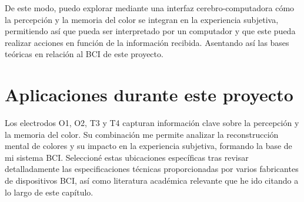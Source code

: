 De este modo, puedo explorar mediante una interfaz cerebro-computadora cómo la percepción y la memoria del color se integran en la experiencia subjetiva, permitiendo así que pueda ser interpretado por un computador y que este pueda realizar acciones en función de la información recibida. Asentando así las bases teóricas en relación al BCI de este proyecto.

\section{Aplicaciones durante este proyecto}
Los electrodos O1, O2, T3 y T4 capturan información clave sobre la percepción y la memoria del color. Su combinación me permite analizar la reconstrucción mental de colores y su impacto en la experiencia subjetiva, formando la base de mi sistema BCI. Seleccioné estas ubicaciones específicas tras revisar detalladamente las especificaciones técnicas proporcionadas por varios fabricantes de dispositivos BCI, así como literatura académica relevante que he ido citando a lo largo de este capítulo.